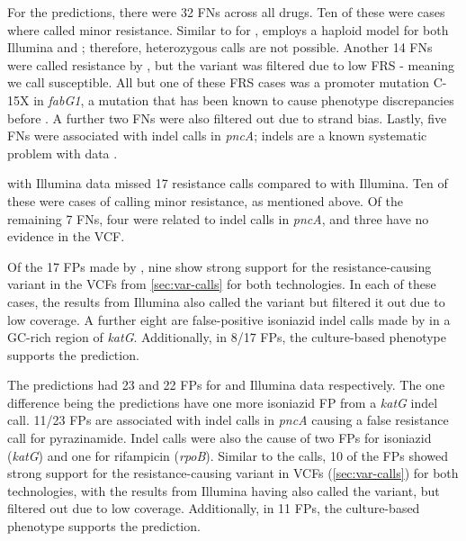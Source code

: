 For the \drprg{} \ont{} predictions, there were 32 FNs across all drugs. Ten of these were cases where \mykrobe{} called minor resistance. Similar to \mykrobe{} for \ont{}, \drprg{} employs a haploid model for both Illumina and \ont{}; therefore, heterozygous calls are not possible. Another 14 FNs were called resistance by \drprg{} \ont{}, but the variant was filtered due to low FRS - meaning we call susceptible. All but one of these FRS cases was a promoter mutation C-15X in \textit{fabG1}, a mutation that has been known to cause phenotype discrepancies before \cite{cryptic2018}. A further two FNs were also filtered out due to strand bias. Lastly, five FNs were associated with indel calls in \textit{pncA}; indels are a known systematic problem with \ont{} data \cite{watson2019}.

\drprg{} with Illumina data missed 17 resistance calls compared to \mykrobe{} with Illumina. Ten of these were cases of \mykrobe{} calling minor resistance, as mentioned above. Of the remaining 7 FNs, four were related to indel calls in \textit{pncA}, and three have no evidence in the \drprg{} VCF.

Of the 17 FPs made by \mykrobe{} \ont{}, nine show strong support for the resistance-causing variant in the VCFs from \autoref{sec:var-calls} for both technologies. In each of these cases, the \mykrobe{} results from Illumina also called the variant but filtered it out due to low coverage. A further eight are false-positive isoniazid indel calls made by \ont{} in a GC-rich region of \textit{katG}. Additionally, in 8/17 FPs, the culture-based phenotype supports the \ont{} prediction.

The \drprg{} predictions had 23 and 22 FPs for \ont{} and Illumina data respectively. The one difference being the \ont{} predictions have one more isoniazid FP from a \textit{katG} indel call. 11/23 FPs are associated with indel calls in \textit{pncA} causing a false resistance call for pyrazinamide. Indel calls were also the cause of two FPs for isoniazid (\textit{katG}) and one for rifampicin (\textit{rpoB}). Similar to the \mykrobe{} \ont{} calls, 10 of the \drprg{} FPs showed strong support for the resistance-causing variant in VCFs (\autoref{sec:var-calls}) for both technologies, with the \mykrobe{} results from Illumina having also called the variant, but filtered out due to low coverage. Additionally, in 11 FPs, the culture-based phenotype supports the \drprg{} prediction.


